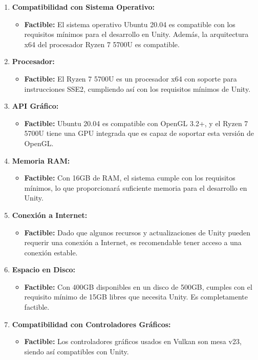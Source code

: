 \begin{enumerate}[label=\arabic*.]
\item \textbf{Compatibilidad con Sistema Operativo:}
\begin{itemize}
\item \textbf{Factible:} El sistema operativo Ubuntu 20.04 es compatible con los requisitos mínimos para el desarrollo en Unity. Además, la arquitectura x64 del procesador Ryzen 7 5700U es compatible.
\end{itemize}

\item \textbf{Procesador:}
\begin{itemize}
\item \textbf{Factible:} El Ryzen 7 5700U es un procesador x64 con soporte para instrucciones SSE2, cumpliendo así con los requisitos mínimos de Unity.
\end{itemize}

\item \textbf{API Gráfico:}
\begin{itemize}
\item \textbf{Factible:} Ubuntu 20.04 es compatible con OpenGL 3.2+, y el Ryzen 7 5700U tiene una GPU integrada que es capaz de soportar esta versión de OpenGL.
\end{itemize}

\item \textbf{Memoria RAM:}
\begin{itemize}
\item \textbf{Factible:} Con 16GB de RAM, el sistema cumple con los requisitos mínimos, lo que proporcionará suficiente memoria para el desarrollo en Unity.
\end{itemize}

\item \textbf{Conexión a Internet:}
\begin{itemize}
\item \textbf{Factible:} Dado que algunos recursos y actualizaciones de Unity pueden requerir una conexión a Internet, es recomendable tener acceso a una conexión estable.
\end{itemize}

\item \textbf{Espacio en Disco:}
\begin{itemize}
\item \textbf{Factible:} Con 400GB disponibles en un disco de 500GB, cumples con el requisito mínimo de 15GB libres que necesita Unity. Es completamente factible.
\end{itemize}

\item \textbf{Compatibilidad con Controladores Gráficos:}
\begin{itemize}
\item \textbf{Factible:} Los controladores gráficos usados en Vulkan son mesa v23, siendo así compatibles con Unity.
\end{itemize}
\end{enumerate}

